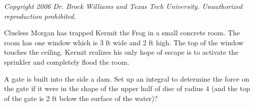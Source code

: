 \documentclass{exam}[12pt]
\begin{document}
\pagestyle{head}

\extraheadheight{.9in}
\extrafootheight{-1in} 
\small{\textit{
Copyright 2006 Dr. Brock Williams and
Texas Tech University.  Unauthorized reproduction prohibited.}}

\begin{questions}
\large{


\question Clueless Morgan has trapped Kermit the Frog in a small 
concrete room.  The room has one window which is 3 ft wide and 2 ft high.
The top of the window touches the ceiling.  Kermit realizes his only hope
of escape is to activate the sprinkler and completely flood the room.

\question A gate is built into the side a dam.
Set up an integral to determine the 
 force on the gate if it were in the shape of the upper half of disc of
radius 4 (and the top of the gate is 2 ft below the surface of the water)?

}
\end{questions}
\end{document}
